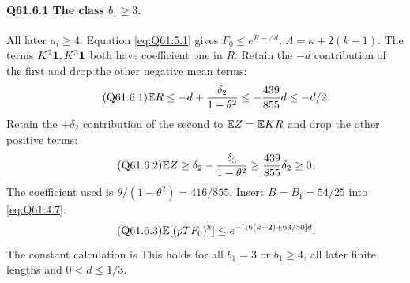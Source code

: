 \paragraph{Q61.6.1 The class \(b_1\ge\allowbreak 3\).}
All later \(a_i\ge\allowbreak 4\). Equation \eqref{eq:Q61:5.1} gives
\(F_0\le\allowbreak  e^{R-\Lambda d}\), \(\Lambda=\allowbreak \kappa+2(k-1)\).
The terms \(K^2\mathbf1,\allowbreak K^3\mathbf1\) both have coefficient one in \(R\).
Retain the \(-d\) contribution of the first and drop the other
negative mean terms:
\begin{equation}\tag{Q61.6.1}\label{eq:Q61:6.1}
\mathbb E R\le-d+\frac{\delta_2}{1-\theta^2}
\le-\frac{439}{855}d\le-d/2.
\end{equation}
Retain the \(+\delta_2\) contribution of the second to \(\mathbb E Z=\allowbreak \mathbb E KR\)
and drop the other positive terms:
\begin{equation}\tag{Q61.6.2}\label{eq:Q61:6.2}
\mathbb E Z\ge\delta_2-\frac{\delta_3}{1-\theta^2}
\ge\frac{439}{855}\delta_2\ge0.
\end{equation}
The coefficient used is \(\theta/(1-\theta^2)=\allowbreak 416/855\).
Insert \(B=\allowbreak B_{\mathrm I}=\allowbreak 54/25\) into \eqref{eq:Q61:4.7}:
\begin{equation}\tag{Q61.6.3}\label{eq:Q61:6.3}
\mathbb E[(pTF_0)^8]\le e^{-[16(k-2)+63/50]d}.
\end{equation}
The constant calculation is
This holds for all \(b_1=\allowbreak 3\) or \(b_1\ge\allowbreak 4\), all later finite
lengths and \(0<\allowbreak d\le\allowbreak 1/3\).

